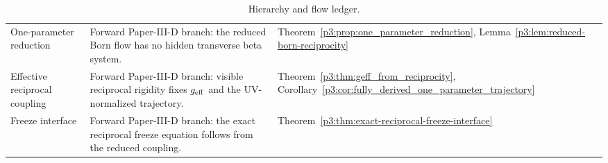 \documentclass[12pt,a4paper]{article}
\begin{document}
\begin{table}[H]
\begin{tabular}{@{}
  L{3.0cm}
  L{7.2cm}
  L{\dimexpr\linewidth-10.2cm-4\tabcolsep\relax}
@{}}
One-parameter reduction
& Forward Paper-III-D branch: the reduced Born flow has no hidden transverse beta system.
& Theorem~\ref{p3:prop:one_parameter_reduction}, Lemma~\ref{p3:lem:reduced-born-reciprocity} \\

Effective reciprocal coupling
& Forward Paper-III-D branch: visible reciprocal rigidity fixes \(g_{\mathrm{eff}}\) and the UV-normalized trajectory.
& Theorem~\ref{p3:thm:geff_from_reciprocity}, Corollary~\ref{p3:cor:fully_derived_one_parameter_trajectory} \\

Freeze interface
& Forward Paper-III-D branch: the exact reciprocal freeze equation follows from the reduced coupling.
& Theorem~\ref{p3:thm:exact-reciprocal-freeze-interface} \\
\bottomrule
\end{tabular}
\caption[Hierarchy and flow ledger]{Hierarchy and flow ledger.}
\label{tab:p3-hierarchy-flow-ledger}
\endgroup
\end{table}
\end{document}
